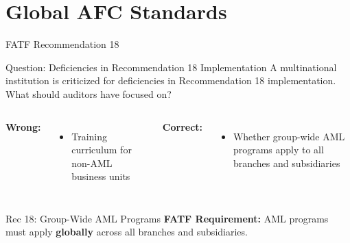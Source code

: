 \documentclass{beamer}
\begin{document}
\section{Global AFC Standards}
\begin{frame}{FATF Recommendation 18}
\begin{block}{Question: Deficiencies in Recommendation 18 Implementation}
\small{A multinational institution is criticized for deficiencies in Recommendation 18 implementation. What should auditors have focused on?}
\end{block}

\begin{columns}
\textcolor{wrong}{\textbf{ Wrong:}}
\begin{itemize}
    \item Training curriculum for non-AML business units
\end{itemize}

\textcolor{correct}{\textbf{Correct:}}
\begin{itemize}
    \item Whether group-wide AML programs apply to all branches and subsidiaries
\end{itemize}
\end{columns}

\begin{block}{Rec 18: Group-Wide AML Programs}
\textbf{FATF Requirement:} AML programs must apply \textbf{globally} across all branches and subsidiaries.
\end{block}
\end{frame}
\end{document}
